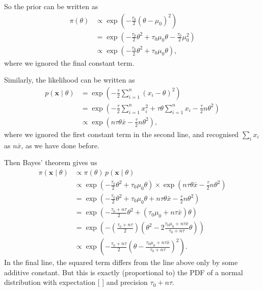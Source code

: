 \documentclass[
  letterpaper,
  DIV=11,
  numbers=noendperiod]{scrreprt}
\theoremstyle{remark}
\begin{document}
So the prior can be written as \begin{align*}
\pi(\theta) &\propto \exp\left(-\frac{\tau_0}{2} (\theta - \mu_0)^2 \right) \\
  &= \exp\left(-\frac{\tau_0}{2}\theta^2 + \tau_0\mu_0\theta -  \frac{\tau_0}{2}\mu_0^2 \right) \\
  &\propto \exp\left(-\frac{\tau_0}{2}\theta^2 + \tau_0\mu_0\theta \right) ,
\end{align*} where we ignored the final constant term.

Similarly, the likelihood can be written as \begin{align*}
p(\mathbf x \mid \theta) &= \exp \left( - \frac{\tau}{2} \sum_{i=1}^n (x_i - \theta)^2 \right) \\
  &= \exp \left( - \frac{\tau}{2} \sum_{i=1}^n x_i^2 + \tau \theta \sum_{i=1}^n x_i - \frac{\tau}{2} n\theta^2 \right) \\
  &\propto \exp \left(n \tau \theta \bar x - \frac{\tau}{2} n\theta^2 \right) ,
\end{align*} where we ignored the first constant term in the second
line, and recognised \(\sum_i x_i\) as \(n\bar x\), as we have done
before.

Then Bayes' theorem gives us \begin{align*}
\pi(\mathbf x \mid \theta)
  &\propto \pi(\theta) \, p(\mathbf x \mid \theta) \\
  &\propto \exp\left(-\frac{\tau_0}{2}\theta^2 + \tau_0\mu_0\theta \right) \times \exp \left(n \tau \theta \bar x - \frac{\tau}{2} n\theta^2 \right) \\
  &= \exp\left(-\frac{\tau_0}{2}\theta^2 + \tau_0\mu_0\theta + n \tau \theta \bar x - \frac{\tau}{2} n\theta^2 \right) \\
  &= \exp \left( -\frac{\tau_0 + n\tau}{2} \theta^2 + (\tau_0\mu_0 + n\tau\bar x)\theta \right) \\
  &= \exp \left( -\left(\frac{\tau_0 + n\tau}{2}\right) \left(\theta^2 - 2 \frac{\tau_0\mu_0 + n\tau\bar x}{\tau_0 + n\tau}\theta \right) \right) \\
  &\propto \exp \left( - \tfrac{\tau_0 + n\tau}{2} \left( \theta - \frac{\tau_0 \mu_0 +n\tau \bar x }{\tau_0 + n\tau} \right)^{\!2} \right) .
\end{align*} In the final line, the squared term differs from the line
above only by some additive constant. But this is exactly (proportional
to) the PDF of a normal distribution with expectation {[}
 {]} and precision
\(\tau_0 + n\tau\).
\end{document}
